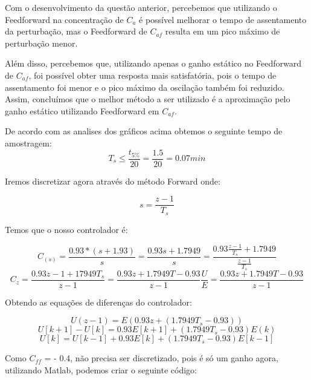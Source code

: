 \documentclass[a4paper,12pt]{article}
\begin{document}
Com o desenvolvimento da questão anterior, percebemos que utilizando o Feedforward na concentração de \(C_a\) é possível melhorar o tempo de assentamento da perturbação, mas o Feedforward de \(C_{af}\) resulta em um pico máximo de perturbação menor.


Além disso, percebemos que, utilizando apenas o ganho estático no Feedforward de \(C_{af}\), foi possível obter uma resposta mais satisfatória, pois o tempo de assentamento foi menor e o pico máximo da oscilação também foi reduzido. Assim, concluímos que o melhor método a ser utilizado é a aproximação pelo ganho estático utilizando Feedforward em \(C_{af}\).


De acordo com as analises dos gráficos acima obtemos o seguinte tempo de amostragem:
\[
T_s \leq \frac{t_{5\%}}{20} = \frac{1.5}{20} = 0.07min
\]

Iremos discretizar agora através do método Forward onde:

\[
s = \frac{z-1}{T_s} 
\]

Temos que o nosso controlador é:

\[
C_(s) = \frac{0.93*(s+1.93)}{s} = \frac{0.93s+1.7949}{s} =
\frac{0.93\frac{z-1}{T_s}+1.7949}{\frac{z-1}{T_s}}\]
\[
C_z = \frac{0.93z-1+17949T_s}{z-1} = \frac{0.93z + 1.7949T - 0.93}{z-1}
\frac{U}{E} = \frac{0.93z + 1.7949T - 0.93}{z-1}
\]

Obtendo as equações de diferenças do controlador:

\[
U(z - 1) = E(0.93z + (1.7949T_s - 0.93))
\]
\[
U[k + 1] - U[k] = 0.93E[k + 1] + (1.7949T_s - 0.93)E(k)
\]
\[
U[k] = U[k - 1] + 0.93E[k] + (1.7949T_s - 0.93)E[k - 1]
\]

Como \(C_{ff}\) = - 0.4, não precisa ser discretizado, pois é só um ganho agora, utilizando Matlab, podemos criar o seguinte código:

\end{document}
